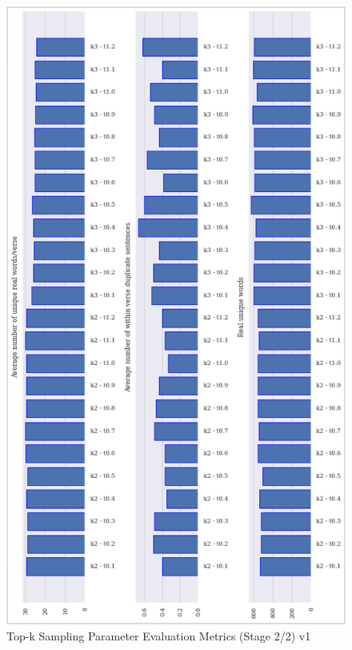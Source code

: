 \begin{figure}[h]
    \centering
    \includegraphics[scale=0.85,keepaspectratio=true]{figures/top-k_param_eval_s2_1.png}
    \caption{Top-k Sampling Parameter Evaluation Metrics (Stage 2/2) v1}
    \label{fig:top-k-param-eval-s2-v1}
\end{figure}

